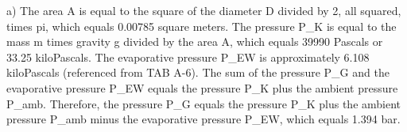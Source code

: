 a) 
The area A is equal to the square of the diameter D divided by 2, all squared, times pi, which equals 0.00785 square meters.
The pressure P_K is equal to the mass m times gravity g divided by the area A, which equals 39990 Pascals or 33.25 kiloPascals.
The evaporative pressure P_EW is approximately 6.108 kiloPascals (referenced from TAB A-6).
The sum of the pressure P_G and the evaporative pressure P_EW equals the pressure P_K plus the ambient pressure P_amb.
Therefore, the pressure P_G equals the pressure P_K plus the ambient pressure P_amb minus the evaporative pressure P_EW, which equals 1.394 bar.